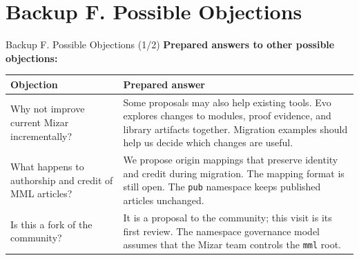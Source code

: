 \documentclass[aspectratio=169,11pt]{beamer}
\begin{document}
\section{Backup F. Possible Objections}
\begin{frame}[fragile,t]{Backup F. Possible Objections (1/2)}
\smallskip
\textbf{Prepared answers to other possible objections:}
\begin{footnotesize}
\setlength{\tabcolsep}{3pt}
\renewcommand{\arraystretch}{1.15}
\begin{tabularx}{\textwidth}{>{\raggedright\arraybackslash}X>{\raggedright\arraybackslash}X}
\toprule
\textbf{Objection} & \textbf{Prepared answer} \\
\midrule
Why not improve current Mizar incrementally? & Some proposals may also help existing tools. Evo explores changes to modules, proof evidence, and library artifacts together. Migration examples should help us decide which changes are useful. \\
What happens to authorship and credit of MML articles? & We propose origin mappings that preserve identity and credit during migration. The mapping format is still open. The \texttt{pub} namespace keeps published articles unchanged. \\
Is this a fork of the community? & It is a proposal to the community; this visit is its first review. The namespace governance model assumes that the Mizar team controls the \texttt{mml} root. \\
\bottomrule
\end{tabularx}
\end{footnotesize}

\end{frame}
\end{document}
